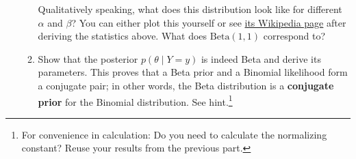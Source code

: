 \documentclass[submit]{harvardml}
\begin{document}
\begin{problem}
\begin{enumerate}
\begin{enumerate}
      Qualitatively speaking, what does this distribution look like for different $\alpha$ and $\beta$? You can either plot this yourself or see \href{https://en.wikipedia.org/wiki/Beta_distribution}{its Wikipedia page} after deriving the statistics above. What does $\mathrm{Beta}(1, 1)$ correspond to?

      \item 
      Show that the posterior
      \(p(\theta \mid Y=y)\) is indeed Beta and derive its parameters. This proves that a Beta prior and a Binomial likelihood form a conjugate pair; in other words, the Beta distribution is a \textbf{conjugate prior} for the Binomial distribution. See hint.\footnote{For convenience in calculation: Do you need to calculate the normalizing constant? Reuse your results from the previous part.}
    \end{enumerate}
  
\end{enumerate}
\end{problem}

\newpage
\end{document}
